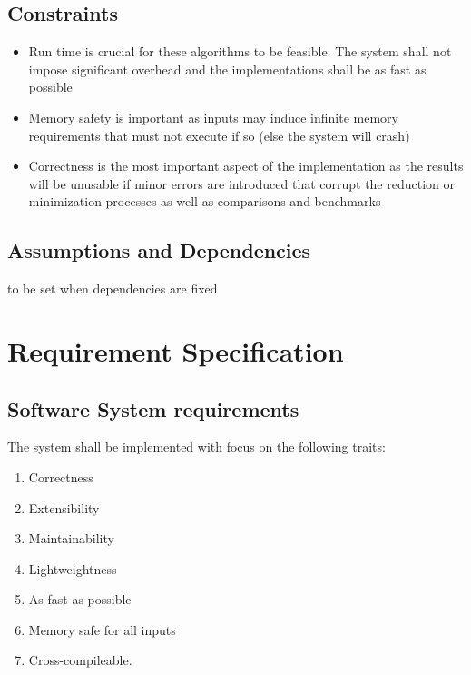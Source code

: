         \subsection{Constraints}
            \begin{itemize}
                \item Run time is crucial for these algorithms to be feasible. The system shall not impose significant overhead and the implementations shall be as fast as possible
                \item Memory safety is important as inputs may induce infinite memory requirements that must not execute if so (else the system will crash)
                \item Correctness is the most important aspect of the implementation as the results will be unusable if minor errors are introduced that corrupt the reduction or minimization processes as well as comparisons and benchmarks
            \end{itemize}

        \subsection{Assumptions and Dependencies}
            to be set when dependencies are fixed
    \newpage       
    
    
    \section{Requirement Specification}
        \subsection{Software System requirements}
            The system shall be implemented with focus on the following traits:
            \begin{enumerate}[S 1.]
                    \item Correctness
                    \item Extensibility
                    \item Maintainability
                    \item Lightweightness
                    \item As fast as possible
                    \item Memory safe for all inputs
                    \item Cross-compileable.
            \end{enumerate}  
    
